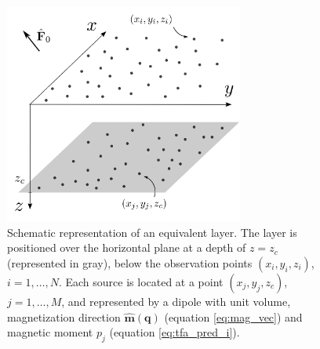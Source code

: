 

\begin{figure}
	\centering
	\includegraphics[width=0.7\textwidth]{Fig/Fig1.png}
	\caption{Schematic representation of an equivalent layer. The layer is positioned over the 
	 horizontal plane at a depth of $z = z_c$ (represented in gray), below the 
	 observation points $(x_{i},y_{i},z_{i})$, $i = 1,\hdots, N$. Each source 
	 is located at a point $(x_{j},y_{j},z_{c})$, $j = 1,\hdots, M$, and represented by a dipole 
	 with unit volume, magnetization direction $\hat{\mathbf{m}}(\mathbf{q})$ 
	 (equation \ref{eq:mag_vec}) and magnetic moment $p_{j}$ (equation \ref{eq:tfa_pred_i}).}
	\label{fig:eqlayer_figure}
\end{figure}



